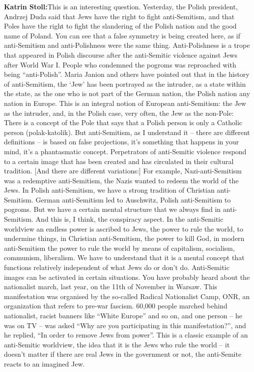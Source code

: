 \textbf{Katrin Stoll:}This is an interesting question. Yesterday, the Polish president, Andrzej Duda said that Jews have the right to fight anti-Semitism, and that Poles have the right to fight the slandering of the Polish nation and the good name of Poland. You can see that a false symmetry is being created here, as if anti-Semitism and anti-Polishness were the same thing. Anti-Polishness is a trope that appeared in Polish discourse after the anti-Semitic violence against Jews after World War I. People who condemned the pogroms was reproached with being “anti-Polish”. Maria Janion and others have pointed out that in the history of anti-Semitism, the ‘Jew’ has been portrayed as the intruder, as a state within the state, as the one who is not part of the German nation, the Polish nation any nation in Europe. This is an integral notion of European anti-Semitism: the Jew as the intruder, and, in the Polish case, very often, the Jew as the non-Pole: There is a concept of the Pole that says that a Polish person is only a Catholic person (polak-katolik). But anti-Semitism, as I understand it – there are different definitions – is based on false projections, it’s something that happens in your mind, it’s a phantasmatic concept. Perpetrators of anti-Semitic violence respond to a certain image that has been created and has circulated in their cultural tradition. [And there are different variations:] For example, Nazi-anti-Semitism was a redemptive anti-Semitism, the Nazis wanted to redeem the world of the Jews. In Polish anti-Semitism, we have a strong tradition of Christian anti-Semitism. German anti-Semitism led to Auschwitz, Polish anti-Semitism to pogroms. But we have a certain mental structure that we always find in anti-Semitism. And this is, I think, the conspiracy aspect. In the anti-Semitic worldview an endless power is ascribed to Jews, the power to rule the world, to undermine things, in Christian anti-Semitism, the power to kill God, in modern anti-Semitism the power to rule the world by means of capitalism, socialism, communism, liberalism. We have to understand that it is a mental concept that functions relatively independent of what Jews do or don’t do. Anti-Semitic images can be activated in certain situations. You have probably heard about the nationalist march, last year, on the 11th of November in Warsaw. This manifestation was organised by the so-called Radical Nationalist Camp, ONR, an organization that refers to pre-war fascism. 60,000 people marched behind nationalist, racist banners like “White Europe” and so on, and one person – he was on TV – was asked “Why are you participating in this manifestation?”, and he replied, “In order to remove Jews from power”. This is a classic example of an anti-Semitic worldview, the idea that it is the Jews who rule the world – it doesn’t matter if there are real Jews in the government or not, the anti-Semite reacts to an imagined Jew.\\
